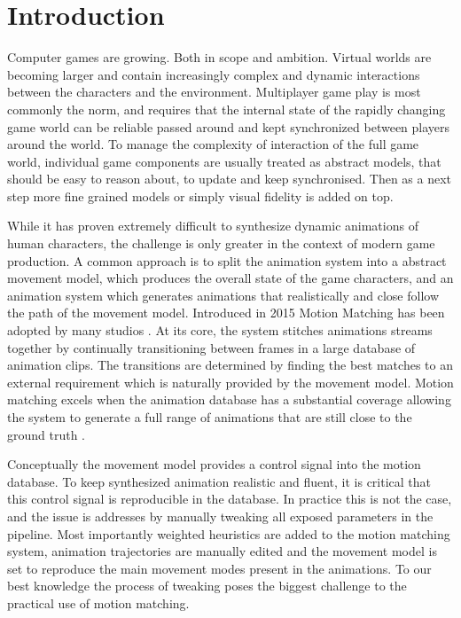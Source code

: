\section{Introduction}
Computer games are growing. Both in scope and ambition. Virtual worlds are becoming larger and contain increasingly complex and dynamic interactions between the characters and the environment. Multiplayer game play is most commonly the norm, and requires that the internal state of the rapidly changing game world can be reliable passed around and kept synchronized between players around the world. To manage the complexity of interaction of the full game world, individual game components are usually treated as abstract models, that should be easy to reason about, to update and keep synchronised. Then as a next step more fine grained models or simply visual fidelity is added on top. 

While it has proven extremely difficult to synthesize dynamic animations of human characters, the challenge is only greater in the context of modern game production. A common approach  is to split the animation system into a abstract movement model, which produces the overall state of the game characters, and an animation system  which generates animations that realistically and close follow the path of the movement model. Introduced in 2015 Motion Matching has been adopted by many studios . At its core, the system stitches animations streams together by continually transitioning between frames in a large database of animation clips. The transitions are determined by finding the best matches to an external requirement which is naturally provided by the movement model. Motion matching excels when the animation database has a substantial coverage allowing the system to generate a full range of animations that are still close to the ground truth . 


Conceptually the movement model provides a control signal into the motion database. To keep synthesized animation realistic and fluent, it is critical that this control signal is reproducible in the database. In practice  this is not the case, and the issue is addresses by manually tweaking all exposed parameters in the pipeline. Most importantly weighted heuristics are added to the motion matching system, animation trajectories are manually edited and the movement model is set to reproduce the main movement modes present in the animations. To our best knowledge the process of tweaking poses the biggest challenge to the practical use of motion matching.  

